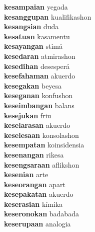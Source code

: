 \textbf{kesampaian } yegada \\
\textbf{kesanggupan } kualifikashon \\
\textbf{kesangsian } duda \\
\textbf{kesatuan } kasamentu \\
\textbf{kesayangan } stimá \\
\textbf{kesedaran } atmirashon \\
\textbf{kesedihan } desesperá \\
\textbf{kesefahaman } akuerdo \\
\textbf{kesegakan } beyesa \\
\textbf{keseganan } konfushon \\
\textbf{keseimbangan } balans \\
\textbf{kesejukan } friu \\
\textbf{keselarasan } akuerdo \\
\textbf{keselesaan } konsolashon \\
\textbf{kesempatan } koinsidensia \\
\textbf{kesenangan } rikesa \\
\textbf{kesengsaraan } aflikshon \\
\textbf{kesenian } arte \\
\textbf{keseorangan } apart \\
\textbf{kesepakatan } akuerdo \\
\textbf{keserasian } kímika \\
\textbf{keseronokan } badabada \\
\textbf{keserupaan } analogia \\
